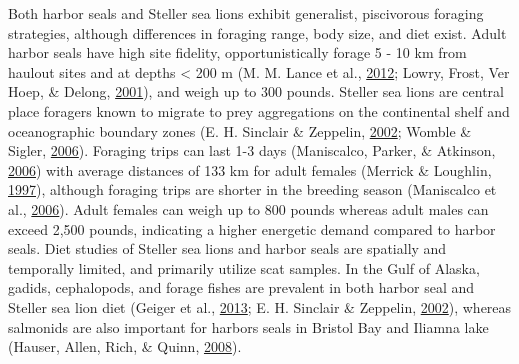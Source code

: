 \documentclass [11pt, proquest] {uwthesis}[2015/03/03]
\begin{document}
Both harbor seals and Steller sea lions exhibit generalist, piscivorous
foraging strategies, although differences in foraging range, body size,
and diet exist. Adult harbor seals have high site fidelity,
opportunistically forage 5 - 10 km from haulout sites and at depths
\textless{} 200 m (M. M. Lance et al.,
\protect\hyperlink{ref-Lance2012}{2012}; Lowry, Frost, Ver Hoep, \&
Delong, \protect\hyperlink{ref-Lowry2001}{2001}), and weigh up to 300
pounds. Steller sea lions are central place foragers known to migrate to
prey aggregations on the continental shelf and oceanographic boundary
zones (E. H. Sinclair \& Zeppelin,
\protect\hyperlink{ref-Sinclair2002}{2002}; Womble \& Sigler,
\protect\hyperlink{ref-Womble2006}{2006}). Foraging trips can last 1-3
days (Maniscalco, Parker, \& Atkinson,
\protect\hyperlink{ref-Maniscalco2006}{2006}) with average distances of
133 km for adult females (Merrick \& Loughlin,
\protect\hyperlink{ref-Merrick1997}{1997}), although foraging trips are
shorter in the breeding season (Maniscalco et al.,
\protect\hyperlink{ref-Maniscalco2006}{2006}). Adult females can weigh
up to 800 pounds whereas adult males can exceed 2,500 pounds, indicating
a higher energetic demand compared to harbor seals. Diet studies of
Steller sea lions and harbor seals are spatially and temporally limited,
and primarily utilize scat samples. In the Gulf of Alaska, gadids,
cephalopods, and forage fishes are prevalent in both harbor seal and
Steller sea lion diet (Geiger et al.,
\protect\hyperlink{ref-Geiger2013}{2013}; E. H. Sinclair \& Zeppelin,
\protect\hyperlink{ref-Sinclair2002}{2002}), whereas salmonids are also
important for harbors seals in Bristol Bay and Iliamna lake (Hauser,
Allen, Rich, \& Quinn, \protect\hyperlink{ref-Hauser2008}{2008}).
\end{document}
